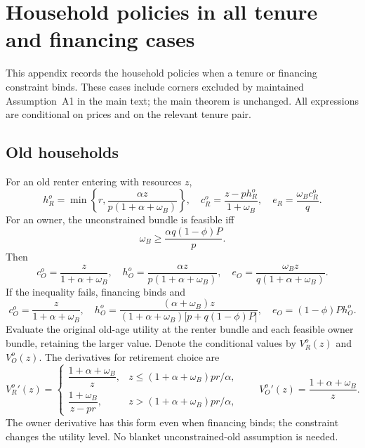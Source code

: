 \documentclass[11pt]{article}
\begin{document}
\clearpage
\section{Household policies in all tenure and financing cases}\label{app:all_policies}

This appendix records the household policies when a tenure or financing
constraint binds. These cases include corners excluded by maintained
Assumption~A1 in the main text; the main theorem is unchanged. All expressions
are conditional on prices and on the relevant tenure pair.

\subsection{Old households}

For an old renter entering with resources $z$,
\begin{equation}
h_R^o=\min\left\{r,\frac{\alpha z}{p(1+\alpha+\omega_B)}\right\},\quad
c_R^o=\frac{z-ph_R^o}{1+\omega_B},\quad
e_R=\frac{\omega_B c_R^o}{q}.
\end{equation}
For an owner, the unconstrained bundle is feasible iff
\begin{equation}
\omega_B\geq \frac{\alpha q(1-\phi)P}{p}.
\end{equation}
Then
\begin{equation}
c_O^o=\frac{z}{1+\alpha+\omega_B},\quad
h_O^o=\frac{\alpha z}{p(1+\alpha+\omega_B)},\quad
e_O=\frac{\omega_B z}{q(1+\alpha+\omega_B)}.
\end{equation}
If the inequality fails, financing binds and
\begin{equation}
c_O^o=\frac{z}{1+\alpha+\omega_B},\quad
h_O^o=\frac{(\alpha+\omega_B)z}
{(1+\alpha+\omega_B)\bigl[p+q(1-\phi)P\bigr]},\quad
e_O=(1-\phi)Ph_O^o.
\end{equation}
Evaluate the original old-age utility at the renter bundle and each feasible
owner bundle, retaining the larger value. Denote the conditional values by
$V_R^o(z)$ and $V_O^o(z)$. The derivatives for retirement choice are
\begin{equation}
{V_R^o}'(z)=\begin{cases}
\dfrac{1+\alpha+\omega_B}{z},&z\leq(1+\alpha+\omega_B)pr/\alpha,\\[4pt]
\dfrac{1+\omega_B}{z-pr},&z>(1+\alpha+\omega_B)pr/\alpha,
\end{cases}\qquad
{V_O^o}'(z)=\frac{1+\alpha+\omega_B}{z}.
\end{equation}
The owner derivative has this form even when financing binds; the constraint
changes the utility level. No blanket unconstrained-old assumption is needed.
\end{document}
